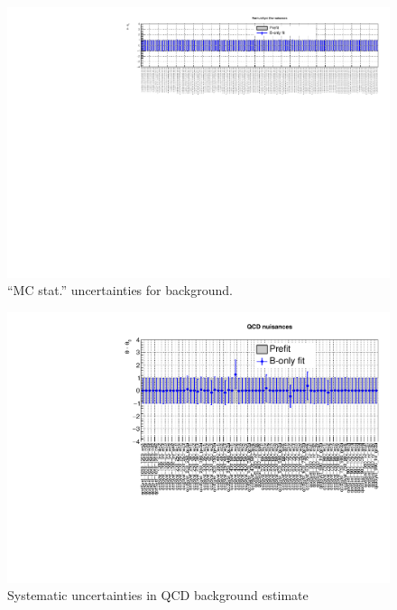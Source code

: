 \begin{figure}[h!]
  \centering
  \caption{``MC stat.'' uncertainties for \znunuj background.}
  \includegraphics[width=1.\linewidth]{figures/results/36invfb_approval/postfit/nuis/FormulaSystZinv_nuisances}
\end{figure}

\clearpage
\begin{figure}[h!]
  \centering
  \caption{Systematic uncertainties in QCD background estimate}
  \includegraphics[width=1.\linewidth]{figures/results/36invfb_approval/postfit/nuis/qcd_nuisances}
\end{figure}

